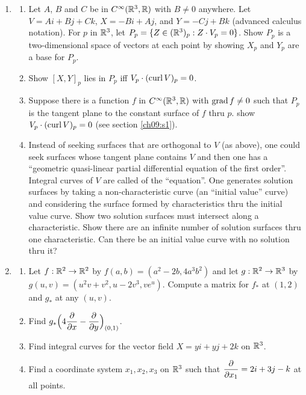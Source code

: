 \documentclass[../main]{subfiles}
\begin{document}
\begin{enumerate}
\item\label{pro:11}
\begin{enumerate}[label=(\roman{enumii})]
    \item Let $A$, $B$ and $C$ be in $C^\infty(\mathbb{R}^3, \mathbb{R})$ with $B \ne 0$ anywhere. Let\newline $V=Ai + Bj + Ck$, $X= -Bi + Aj$, and $Y=-Cj + Bk$ (advanced calculus notation). For $p$ in $\mathbb{R}^3$, let $P_p = \{Z \in (\mathbb{R}^3)_p : Z \cdot V_p = 0\}$. Show $P_p$ is a two-dimensional space of vectors at each point by showing $X_p$ and $Y_p$ are a base for $P_p$. 
    \item Show $[X,Y]_p$ lies in $P_p$ iff $V_p \cdot (\operatorname{curl} V)_p = 0$.
    \item Suppose there is a function $f$ in $C^\infty(\mathbb{R}^3, \mathbb{R})$ with $\operatorname{grad} f \ne 0$ such that $P_p$ is the tangent plane to the constant surface of $f$ thru $p$. show $V_p \cdot (\operatorname{curl} V)_p = 0$ (see section \ref{ch09:s1}).
    \item Instead of seeking surfaces that are orthogonal to $V$ (as above), one could seek surfaces whose tangent plane contains $V$ and then one has a ``geometric quasi-linear partial differential equation of the first order''. Integral curves of $V$ are called  of the ``equation''. One generates solution surfaces by taking a non-characteristic curve (an ``initial value'' curve) and considering the surface formed by characteristics thru the initial value curve. Show two solution surfaces must intersect along a characteristic. Show there are an infinite number of solution surfaces thru one characteristic. Can there be an initial value curve with no solution thru it?
\end{enumerate}


\item\label{pro:12}
\begin{enumerate}[label=(\roman{enumii})]
    \item Let $f: \mathbb{R}^2 \to \mathbb{R}^2$ by $f(a,b) = (a^2 - 2b, 4a^3b^2)$ and let $g: \mathbb{R}^2 \to \mathbb{R}^3$ by $g(u,v) = (u^2 v + v^2, u - 2v^3, ve^u)$. Compute a matrix for $f_*$ at $(1,2)$ and $g_*$ at any $(u,v)$.
    \item Find $g_* \Big(4\dfrac{\partial }{\partial x}- \dfrac{\partial }{\partial  y}\Big)_{(0,1)}$.
    \item Find integral curves for the vector field $X = yi + yj + 2k$ on $\mathbb{R}^3$.
    \item Find a coordinate system $x_1, x_2, x_3$ on $\mathbb{R}^3$ such that $\dfrac{\partial }{\partial  x_1} = 2i + 3j - k$ at all points. 
\end{enumerate}



\end{enumerate}
\end{document}
